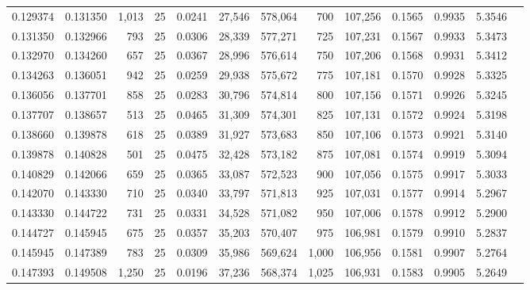 \begin{tabular}{rrrrrrrrrrrrr}
0.129374 & 0.131350 & 1,013 &  25 &                                     0.0241 &  27,546 & 578,064 &     700 & 107,256 & 0.1565 & 0.9935 & 5.3546 \\
0.131350 & 0.132966 &   793 &  25 &                                     0.0306 &  28,339 & 577,271 &     725 & 107,231 & 0.1567 & 0.9933 & 5.3473 \\
0.132970 & 0.134260 &   657 &  25 &                                     0.0367 &  28,996 & 576,614 &     750 & 107,206 & 0.1568 & 0.9931 & 5.3412 \\
0.134263 & 0.136051 &   942 &  25 &                                     0.0259 &  29,938 & 575,672 &     775 & 107,181 & 0.1570 & 0.9928 & 5.3325 \\
0.136056 & 0.137701 &   858 &  25 &                                     0.0283 &  30,796 & 574,814 &     800 & 107,156 & 0.1571 & 0.9926 & 5.3245 \\
0.137707 & 0.138657 &   513 &  25 &                                     0.0465 &  31,309 & 574,301 &     825 & 107,131 & 0.1572 & 0.9924 & 5.3198 \\
0.138660 & 0.139878 &   618 &  25 &                                     0.0389 &  31,927 & 573,683 &     850 & 107,106 & 0.1573 & 0.9921 & 5.3140 \\
0.139878 & 0.140828 &   501 &  25 &                                     0.0475 &  32,428 & 573,182 &     875 & 107,081 & 0.1574 & 0.9919 & 5.3094 \\
0.140829 & 0.142066 &   659 &  25 &                                     0.0365 &  33,087 & 572,523 &     900 & 107,056 & 0.1575 & 0.9917 & 5.3033 \\
0.142070 & 0.143330 &   710 &  25 &                                     0.0340 &  33,797 & 571,813 &     925 & 107,031 & 0.1577 & 0.9914 & 5.2967 \\
0.143330 & 0.144722 &   731 &  25 &                                     0.0331 &  34,528 & 571,082 &     950 & 107,006 & 0.1578 & 0.9912 & 5.2900 \\
0.144727 & 0.145945 &   675 &  25 &                                     0.0357 &  35,203 & 570,407 &     975 & 106,981 & 0.1579 & 0.9910 & 5.2837 \\
0.145945 & 0.147389 &   783 &  25 &                                     0.0309 &  35,986 & 569,624 &   1,000 & 106,956 & 0.1581 & 0.9907 & 5.2764 \\
0.147393 & 0.149508 & 1,250 &  25 &                                     0.0196 &  37,236 & 568,374 &   1,025 & 106,931 & 0.1583 & 0.9905 & 5.2649 \\

\end{tabular}
